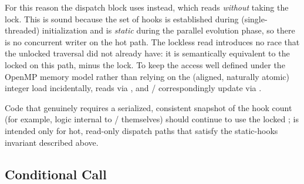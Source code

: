 For this reason the dispatch block uses  instead, which reads  \emph{without} taking the lock. This is sound because the set of hooks is established during (single-threaded) initialization and is \emph{static} during the parallel evolution phase, so there is no concurrent writer on the hot path. The lockless read introduces no race that the unlocked traversal did not already have: it is semantically equivalent to the locked  on this path, minus the lock. To keep the access well defined under the OpenMP memory model rather than relying on the (aligned, naturally atomic) integer load incidentally,  reads  via , and / correspondingly update  via .

Code that genuinely requires a serialized, consistent snapshot of the hook count (for example, logic internal to / themselves) should continue to use the locked ;  is intended only for hot, read-only dispatch paths that satisfy the static-hooks invariant described above.

\subsection{Conditional Call}

